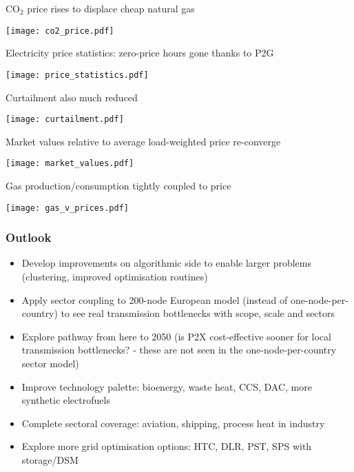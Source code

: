 \documentclass[10pt,aspectratio=169,dvipsnames]{beamer}
\let\olditem\item
\renewcommand{\item}{%
\olditem\vspace{5pt}}
\begin{document}
\begin{frame}{CO$_2$ price rises to displace cheap natural gas}

  \centering
    \texttt{[image: co2\_price.pdf]}

\end{frame}


\begin{frame}{Electricity price statistics: zero-price hours gone thanks to P2G}

  \centering
    \texttt{[image: price\_statistics.pdf]}

\end{frame}



\begin{frame}{Curtailment also much reduced}

  \centering
    \texttt{[image: curtailment.pdf]}

\end{frame}



\begin{frame}{Market values relative to average load-weighted price re-converge}

  \centering
    \texttt{[image: market\_values.pdf]}

\end{frame}




\begin{frame}{Gas production/consumption tightly coupled to price}

  \centering
    \texttt{[image: gas\_v\_prices.pdf]}

\end{frame}




\begin{frame}
  \frametitle{Outlook}

  \begin{itemize}
  \item Develop improvements on  algorithmic side to enable larger problems (clustering, improved optimisation routines)
  \item Apply sector coupling to 200-node European model (instead of
    one-node-per-country) to see real transmission bottlenecks with scope, scale and sectors
  \item Explore pathway from here to 2050 (is P2X cost-effective sooner for local transmission bottlenecks? - these are not seen in the one-node-per-country sector model)
  \item Improve technology palette: bioenergy, waste heat, CCS, DAC, more synthetic electrofuels
 \item Complete sectoral coverage: aviation, shipping, process heat
   in industry
    \item Explore more grid optimisation options: HTC, DLR, PST, SPS with
      storage/DSM
  \end{itemize}
\end{frame}
\end{document}
